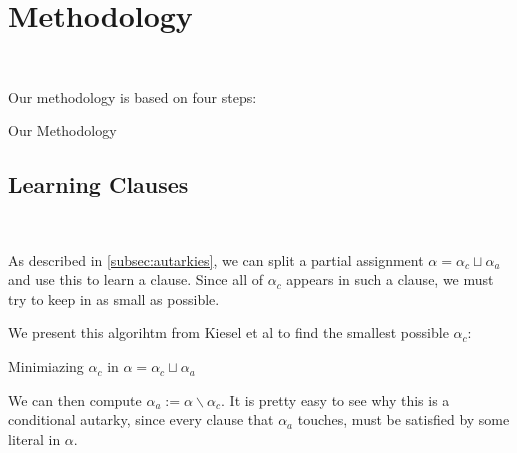 \section{Methodology}~\label{sec:method}

Our methodology is based on four steps:
\begin{algorithm}
    \caption{Our Methodology}\label{alg:methodology}
    \SetAlgoNoLine

\end{algorithm}

\subsection{Learning Clauses}~\label{subsec:learning}

As described in \autoref{subsec:autarkies}, we can split a partial assignment $\alpha = \alpha_c \sqcup \alpha_a$ and use this to learn a \pr clause. Since all of $\alpha_c$ appears in such a clause, we must try to keep in as small as possible.

We present this algorihtm from Kiesel et al \cite{conditionalautarkies} to find the smallest possible $\alpha_c$:


\begin{algorithm}
    \caption{Minimiazing $\alpha_c$ in $\alpha = \alpha_c \sqcup \alpha_a$}\label{alg:leastcond}
    \SetAlgoNoLine

\end{algorithm}

We can then compute $\alpha_a := \alpha \backslash \alpha_c$. It is pretty easy to see why this is a conditional autarky, since every clause that $\alpha_a$ touches, must be satisfied by some literal in $\alpha$.

